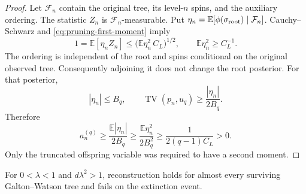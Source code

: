 \begin{proof}
Let $\mathcal F_n$ contain the original tree, its level-$n$ spins, and
the auxiliary ordering.  The statistic $Z_n$ is $\mathcal F_n$-measurable.
Put $\eta_n=\mathbb E[\phi(\sigma_{\rm root})\mid\mathcal F_n]$.
Cauchy--Schwarz and \eqref{eq:pruning-first-moment} imply
\[
 1=\mathbb E[\eta_nZ_n]
 \le\bigl(\mathbb E\eta_n^2\,C_L\bigr)^{1/2},
 \qquad \mathbb E\eta_n^2\ge C_L^{-1}.
\]
The ordering is independent of the root and spins conditional on the
original observed tree.  Consequently adjoining it does not change the
root posterior.  For that posterior,
\[
 |\eta_n|\le B_q,\qquad
 \operatorname{TV}(p_n,u_q)\ge\frac{|\eta_n|}{2B_q}.
\]
Therefore
\begin{equation}
 a_n^{(q)}
 \ge\frac{\mathbb E|\eta_n|}{2B_q}
 \ge\frac{\mathbb E\eta_n^2}{2B_q^2}
 \ge\frac1{2(q-1)C_L}>0.
 \label{eq:supercritical-advantage}
\end{equation}
Only the truncated offspring variable was required to have a second
moment.
\end{proof}

\begin{lemma}
\label{lem:survival-reconstruction}
For $0<\lambda<1$ and $d\lambda^2>1$, reconstruction holds for almost
every surviving Galton--Watson tree and fails on the extinction event.
\end{lemma}


